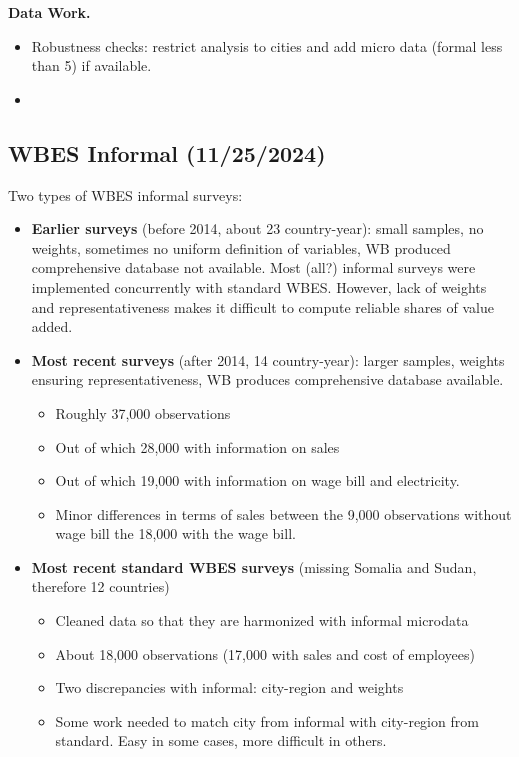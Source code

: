\documentclass[letterpaper, 12pt]{article}
\begin{document}
\textbf{Data Work.}
\begin{itemize}
    \item Robustness checks: restrict analysis to cities and add micro data (formal less than 5) if available.
    \item 
\end{itemize}

\subsection*{WBES Informal (11/25/2024)}
Two types of WBES informal surveys:
\begin{itemize}
    \item \textbf{Earlier surveys} (before 2014, about 23 country-year): small samples, no weights, sometimes no uniform definition of variables, WB produced comprehensive database not available. Most (all?) informal surveys were implemented concurrently with standard WBES. However, lack of weights and representativeness makes it difficult to compute reliable shares of value added.
    \item \textbf{Most recent surveys} (after 2014, 14 country-year): larger samples, weights ensuring representativeness, WB produces comprehensive database available. 
    \begin{itemize}
        \item Roughly 37,000 observations
        \item Out of which 28,000 with information on sales
        \item Out of which 19,000 with information on wage bill and electricity.
        \item Minor differences in terms of sales between the 9,000 observations without wage bill the 18,000 with the wage bill.
    \end{itemize}
    \item \textbf{Most recent standard WBES surveys} (missing Somalia and Sudan, therefore 12 countries)
    \begin{itemize}
        \item Cleaned data so that they are harmonized with informal microdata
        \item About 18,000 observations (17,000 with sales and cost of employees)
        \item Two discrepancies with informal: city-region and weights
        \item Some work needed to match city from informal with city-region from standard. Easy in some cases, more difficult in others.

\end{itemize}
\end{itemize}
\end{document}
